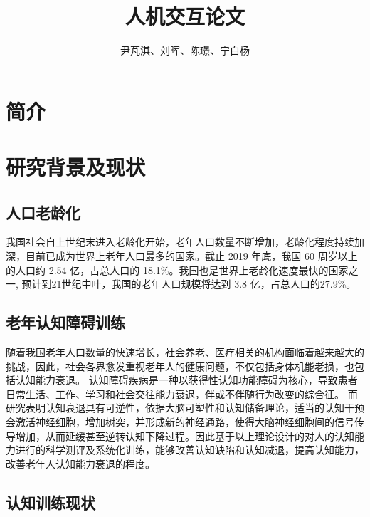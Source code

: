 \documentclass{article}
\author{尹芃淇、刘晖、陈璟、宁白杨}
\title{人机交互论文}
\begin{document}
    \maketitle
    \section{简介}
        \subsection{}
            \subsubsection{}
    \section{研究背景及现状}
        \subsection{人口老龄化}
        我国社会自上世纪末进入老龄化开始，老年人口数量不断增加，老龄化程度持续加深，目前已成为世界上老年人口最多的国家。截止 2019 年底，我国 60 周岁以上的人口约 2.54 亿，占总人口的 18.1\%。我国也是世界上老龄化速度最快的国家之一,
        预计到21世纪中叶，我国的老年人口规模将达到 3.8 亿，占总人口的27.9\%。
        
        \subsection{老年认知障碍训练}

        随着我国老年人口数量的快速增长，社会养老、医疗相关的机构面临着越来越大的挑战，因此，社会各界愈发重视老年人的健康问题，不仅包括身体机能老损，也包括认知能力衰退。
        认知障碍疾病是一种以获得性认知功能障碍为核心，导致患者日常生活、工作、学习和社会交往能力衰退，伴或不伴随行为改变的综合征。
        而研究表明认知衰退具有可逆性，依据大脑可塑性和认知储备理论\cite{ref1}，适当的认知干预会激活神经细胞，增加树突，并形成新的神经通路，使得大脑神经细胞间的信号传导增加\cite{ref2}，从而延缓甚至逆转认知下降过程。因此基于以上理论设计的对人的认知能力进行的科学测评及系统化训练，能够改善认知缺陷和认知减退，提高认知能力\cite{ref3, ref4}，改善老年人认知能力衰退的程度。

        \subsection{认知训练现状}
\end{document}
